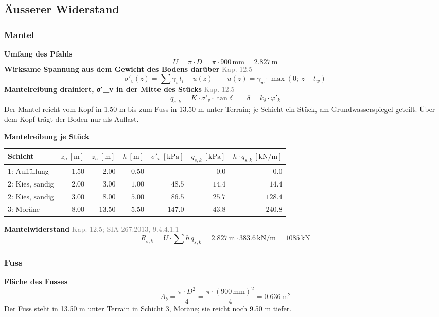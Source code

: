 \documentclass[11pt,a4paper]{article}
\newcommand{\normref}[1]{{\small\textcolor{gray}{#1}}}
\begin{document}
\subsection{Äusserer Widerstand}
\subsubsection{Mantel}
\noindent\textbf{Umfang des Pfahls}
\begin{equation*}
U = \pi \cdot D = \pi \cdot 900\,\mathrm{mm} = 2.827\,\mathrm{m}
\end{equation*}
\noindent\textbf{Wirksame Spannung aus dem Gewicht des Bodens darüber} \hfill \normref{Kap. 12.5}
\begin{equation*}
\sigma'_v(z) = \sum \gamma_i \, t_i - u(z) \qquad u(z) = \gamma_w \cdot \max\left(0;\ z - t_w\right)
\end{equation*}
\noindent\textbf{Mantelreibung drainiert, σ'\_v in der Mitte des Stücks} \hfill \normref{Kap. 12.5}
\begin{equation*}
q_{s,k} = K \cdot \sigma'_v \cdot \tan\delta \qquad \delta = k_{\delta} \cdot \varphi'_k
\end{equation*}
Der Mantel reicht vom Kopf in 1.50 m bis zum Fuss in 13.50 m unter Terrain; je Schicht ein Stück, am Grundwasserspiegel geteilt. Über dem Kopf trägt der Boden nur als Auflast.

\noindent\textbf{Mantelreibung je Stück}
\begin{longtable}{lrrrrrr}
\hline
Schicht & $z_o\ [\mathrm{m}]$ & $z_u\ [\mathrm{m}]$ & $h\ [\mathrm{m}]$ & $\sigma'_v\ [\mathrm{kPa}]$ & $q_{s,k}\ [\mathrm{kPa}]$ & $h \cdot q_{s,k}\ [\mathrm{kN/m}]$ \\
\hline
\endhead
1: Auffüllung & $1.50$ & $2.00$ & $0.50$ & – & $0.0$ & $0.0$ \\
2: Kies, sandig & $2.00$ & $3.00$ & $1.00$ & $48.5$ & $14.4$ & $14.4$ \\
2: Kies, sandig & $3.00$ & $8.00$ & $5.00$ & $86.5$ & $25.7$ & $128.4$ \\
3: Moräne & $8.00$ & $13.50$ & $5.50$ & $147.0$ & $43.8$ & $240.8$ \\
\hline
\end{longtable}
\noindent\textbf{Mantelwiderstand} \hfill \normref{Kap. 12.5; SIA 267:2013, 9.4.4.1.1}
\begin{equation*}
R_{s,k} = U \cdot \sum h \, q_{s,k} = 2.827\,\mathrm{m} \cdot 383.6\,\mathrm{kN}/\mathrm{m} = 1085\,\mathrm{kN}
\end{equation*}
\subsubsection{Fuss}
\noindent\textbf{Fläche des Fusses}
\begin{equation*}
A_b = \frac{\pi \cdot D^{2}}{4} = \frac{\pi \cdot \left(900\,\mathrm{mm}\right)^{2}}{4} = 0.636\,\mathrm{m}^{2}
\end{equation*}
Der Fuss steht in 13.50 m unter Terrain in Schicht 3, Moräne; sie reicht noch 9.50 m tiefer.
\end{document}
